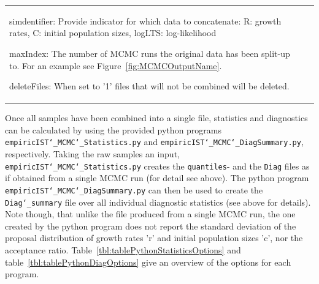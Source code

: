 \documentclass[12pt,a4paper]{scrartcl}
\begin{document}
{\begin{scriptsize}
\begin{tabularx}{1\textwidth}{>{\raggedright\arraybackslash}m{1.6cm} >{\raggedright\arraybackslash}m{} >{\raggedright\arraybackslash}m{8.7cm}}
simdentifier: Provide indicator for which data to concatenate: R: growth rates, C: initial population sizes, logLTS: log-likelihood
\vspace{0.05cm}

maxIndex: The number of MCMC runs the original data has been split-up to. For an example see Figure~\ref{fig:MCMCOutputName}.
\vspace{0.05cm}

deleteFiles: When set to '1' files that will not be combined will be deleted.
\vspace{0.05cm}

\end{tabularx}
\end{scriptsize}
}

Once all samples have been combined into a single file, statistics and diagnostics can be calculated by using the provided python programs \texttt{empiricIST\char`_MCMC\char`_Statistics.py} and  \texttt{empiricIST\char`_MCMC\char`_DiagSummary.py}, respectively. Taking the raw samples an input, \texttt{empiricIST\char`_MCMC\char`_Statistics.py} creates the \texttt{quantiles}- and the \texttt{Diag} files as if obtained from a single MCMC run (for detail see above). The python program \texttt{empiricIST\char`_MCMC\char`_DiagSummary.py} can then be used to create the \texttt{Diag\char`_summary} file over all individual diagnostic statistics (see above for details). Note though, that unlike the file produced from a single MCMC run, the one created by the python program does not report the standard deviation of the proposal distribution of growth rates 'r' and initial population sizes 'c', nor the acceptance ratio. Table~\ref{tbl:tablePythonStatisticsOptions} and table~\ref{tbl:tablePythonDiagOptions} give an overview of the options for each program.
\end{document}

